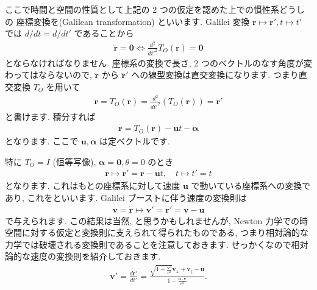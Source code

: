 \documentclass[openany, a4paper, oneside]{jsbook}
\theoremstyle{break}
\theoremstyle{breakdefn}
\begin{document}
ここで時間と空間の性質として上記の 2 つの仮定を認めた上での慣性系どうしの
座標変換を(Galilean transformation) といいます.
Galilei 変換 $\bm{r} \mapsto \bm{r}' , t \mapsto t'$ では
$d/dt = d/dt'$ であることから
    \begin{gather}
        \ddot{ \bm{r} }
        =
        \bm{0}
        \Longleftrightarrow
        \frac{d^2} {dt'^2} T_O ( \bm{r} )
        =
        \bm{0}
    \end{gather}
とならなければなりません.
座標系の変換で長さ, 2 つのベクトルのなす角度が変わってはならないので,
 $\ddot{ \bm{r} }$ から $\ddot{ \bm{r} }'$ への線型変換は直交変換になります.
つまり直交変換 $T_O$ を用いて
    \begin{gather}
        \ddot{ \bm{r} }
        =
        T_O \left ( \ddot { \bm{r} } \right)
        =
        \frac{d^2} {dt'^2} \left ( T_O ( \bm{r} )  \right)
        =
        \ddot{ \bm{r} }'
    \end{gather}
と書けます.
積分すれば
    \begin{gather}
        \bm{r}
        =
        T_O \left ( \bm{r} \right) - \bm{u} t - \bm{ \alpha }
    \end{gather}
となります. ここで $\bm{u} , \bm{ \alpha }$ は定ベクトルです.

特に $T_O = I$ (恒等写像), $\bm{\alpha} = \bm{0} , \theta = 0$ のとき
    \begin{gather}
        \bm{r}
        \mapsto
        \bm{r}'
        =
        \bm{r} - \bm{u} t
        , \quad
        t
        \mapsto
        t'
        =
        t
    \end{gather}
となります.
これはもとの座標系に対して速度 $\bm{u}$ で動いている座標系への変換であり,
これをといいます.
Galilei ブーストに伴う速度の変換則は
    \begin{gather}
        \bm{v}
        =
        \dot { \bm{r} }
        \mapsto
        \bm{v}'
        =
        \dot{ \bm{r} }'
        =
        \bm{v} - \bm{u}
    \end{gather}
で与えられます.
この結果は当然, と思うかもしれませんが,
Newton 力学での時空間に対する仮定と変換則に支えられて得られたものである,
つまり相対論的な力学では破壊される変換則であることを注意しておきます.
せっかくなので相対論的な速度の変換則を紹介しておきます.
    \begin{gather}
        \bm{v}'
        =
        \frac{d \bm{r}'} {dt'}
        =
        \frac{ \sqrt{ 1- \frac{ \bm{v}^2 }{ c^2 } } \bm{v}_{\perp} + \bm{v}_{\|} - \bm{u}   }
            { 1 - \frac{ \bm{u} \cdot \bm{v} } { c^2 }  } .
    \end{gather}
\end{document}
